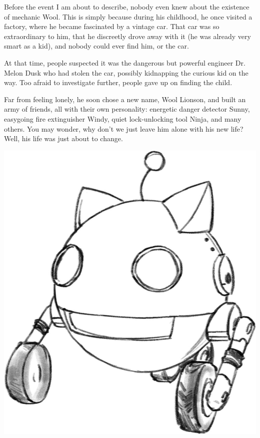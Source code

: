 
Before the event I am about to describe, nobody even knew about the existence of mechanic Wool.
This is simply because during his childhood, he once visited a factory, where he became fascinated by a vintage car. 
That car was so extraordinary to him, that he discreetly drove away with it (he was already very smart as a kid), and nobody could ever find him, or the car. 


At that time, people suspected it was the dangerous but powerful engineer Dr. Melon Dusk who had stolen the car, possibly kidnapping the curious kid on the way. Too afraid to investigate further, people gave up on finding the child.


Far from feeling lonely, he soon chose a new name, Wool Lionson, and built an army of friends, all with their own personality: energetic danger detector Sunny, easygoing fire extinguisher Windy, quiet lock-unlocking tool Ninja, and many others.
You may wonder, why don't we just leave him alone with his new life?
Well, his life was just about to change. 

\begin{center}
    \includegraphics[height=.2\textheight]{Assets/wfbw_kirby}    
\end{center}

